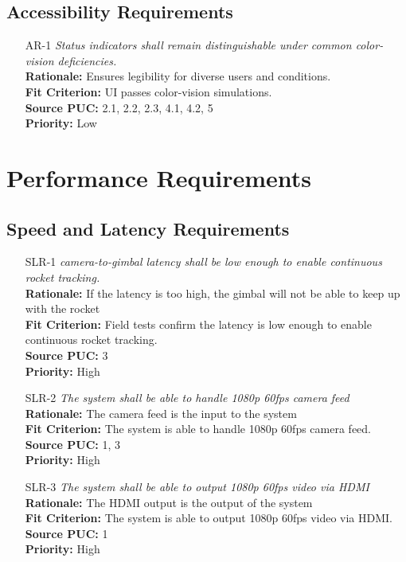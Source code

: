 \documentclass[12pt]{article}
\begin{document}
\subsection{Accessibility Requirements}
\begin{itemize}[leftmargin=*]
  \item[AR-1] \emph{Status indicators shall remain distinguishable under common
          color-vision deficiencies.}\\[2mm]
        \textbf{Rationale:} Ensures legibility for diverse users and conditions.\\
        \textbf{Fit Criterion:} UI passes color-vision simulations.\\
        \textbf{Source PUC:} 2.1, 2.2, 2.3, 4.1, 4.2, 5 \\
        \textbf{Priority:} Low
\end{itemize}

\section{Performance Requirements}
\subsection{Speed and Latency Requirements}
\begin{itemize}[leftmargin=*]
  \item[SLR-1] \emph{camera-to-gimbal latency shall be low enough to enable continuous
          rocket tracking.}\\[2mm]
        \textbf{Rationale:} If the latency is too high, the gimbal will not be able to keep up with the rocket\\
        \textbf{Fit Criterion:} Field tests confirm the latency is low enough to enable continuous rocket tracking.\\
        \textbf{Source PUC:} 3 \\
        \textbf{Priority:} High

  \item[SLR-2] \emph{The system shall be able to handle 1080p 60fps camera feed}\\[2mm]
        \textbf{Rationale:} The camera feed is the input to the system\\
        \textbf{Fit Criterion:} The system is able to handle 1080p 60fps camera feed.\\
        \textbf{Source PUC:} 1, 3 \\
        \textbf{Priority:} High

  \item[SLR-3] \emph{The system shall be able to output 1080p 60fps video via HDMI}\\[2mm]
        \textbf{Rationale:} The HDMI output is the output of the system\\
        \textbf{Fit Criterion:} The system is able to output 1080p 60fps video via HDMI.\\
        \textbf{Source PUC:} 1 \\
        \textbf{Priority:} High
\end{itemize}
\end{document}
